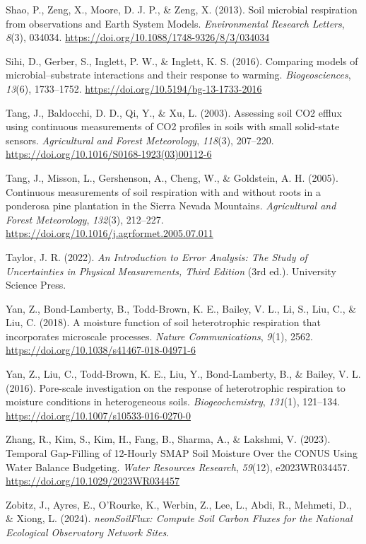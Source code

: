 \documentclass[
  letterpaper,
  DIV=11,
  numbers=noendperiod]{scrartcl}
\newlength{\cslhangindent}
\newenvironment{CSLReferences}[2] %
 {\begin{list}{}{%
  \setlength{\itemindent}{0pt}
  \setlength{\leftmargin}{0pt}
  \setlength{\parsep}{0pt}
  \ifodd #1
   \setlength{\leftmargin}{\cslhangindent}
   \setlength{\itemindent}{-1\cslhangindent}
  \fi
  \setlength{\itemsep}{#2\baselineskip}}}
 {\end{list}}
\begin{document}
\begin{CSLReferences}{1}{0}
Shao, P., Zeng, X., Moore, D. J. P., \& Zeng, X. (2013). Soil microbial
respiration from observations and {Earth System Models}.
\emph{Environmental Research Letters}, \emph{8}(3), 034034.
\url{https://doi.org/10.1088/1748-9326/8/3/034034}

Sihi, D., Gerber, S., Inglett, P. W., \& Inglett, K. S. (2016).
Comparing models of microbial--substrate interactions and their response
to warming. \emph{Biogeosciences}, \emph{13}(6), 1733--1752.
\url{https://doi.org/10.5194/bg-13-1733-2016}

Tang, J., Baldocchi, D. D., Qi, Y., \& Xu, L. (2003). Assessing soil
{CO2} efflux using continuous measurements of {CO2} profiles in soils
with small solid-state sensors. \emph{Agricultural and Forest
Meteorology}, \emph{118}(3), 207--220.
\url{https://doi.org/10.1016/S0168-1923(03)00112-6}

Tang, J., Misson, L., Gershenson, A., Cheng, W., \& Goldstein, A. H.
(2005). Continuous measurements of soil respiration with and without
roots in a ponderosa pine plantation in the {Sierra Nevada Mountains}.
\emph{Agricultural and Forest Meteorology}, \emph{132}(3), 212--227.
\url{https://doi.org/10.1016/j.agrformet.2005.07.011}

Taylor, J. R. (2022). \emph{An {Introduction} to {Error Analysis}: {The
Study} of {Uncertainties} in {Physical Measurements}, {Third Edition}}
(3rd ed.). University Science Press.

Yan, Z., Bond-Lamberty, B., Todd-Brown, K. E., Bailey, V. L., Li, S.,
Liu, C., \& Liu, C. (2018). A moisture function of soil heterotrophic
respiration that incorporates microscale processes. \emph{Nature
Communications}, \emph{9}(1), 2562.
\url{https://doi.org/10.1038/s41467-018-04971-6}

Yan, Z., Liu, C., Todd-Brown, K. E., Liu, Y., Bond-Lamberty, B., \&
Bailey, V. L. (2016). Pore-scale investigation on the response of
heterotrophic respiration to moisture conditions in heterogeneous soils.
\emph{Biogeochemistry}, \emph{131}(1), 121--134.
\url{https://doi.org/10.1007/s10533-016-0270-0}

Zhang, R., Kim, S., Kim, H., Fang, B., Sharma, A., \& Lakshmi, V.
(2023). Temporal {Gap-Filling} of 12-{Hourly SMAP Soil Moisture Over}
the {CONUS Using Water Balance Budgeting}. \emph{Water Resources
Research}, \emph{59}(12), e2023WR034457.
\url{https://doi.org/10.1029/2023WR034457}

Zobitz, J., Ayres, E., O'Rourke, K., Werbin, Z., Lee, L., Abdi, R.,
Mehmeti, D., \& Xiong, L. (2024). \emph{{neonSoilFlux}: {Compute Soil
Carbon Fluxes} for the {National Ecological Observatory Network Sites}}.

\end{CSLReferences}
\end{document}
